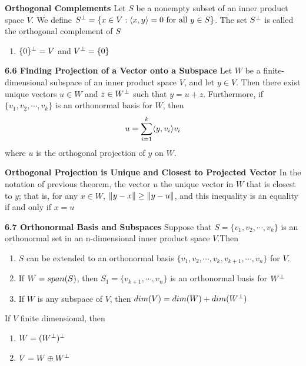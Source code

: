 \documentclass[11pt]{article}
\begin{document}

\begin{defn*}
    \textbf{Orthogonal Complements} Let $S$  be a nonempty subset of an inner product space $V$. We define $S^{\perp} = \{x\in V: \langle x,y\rangle = 0 \text{ for all } y\in S \}$. The set $S^{\perp}$ is called the orthogonal complement of $S$
    \begin{enumerate}
        \item $\{0\}^{\perp} = V$ and $V^{\perp} = \{0\}$ 
    \end{enumerate}
\end{defn*}

\begin{theorem*}
    \textbf{6.6 Finding Projection of a Vector onto a Subspace} Let $W$ be a finite-dimensional subspace of an inner product space $V$, and let $y\in V$. Then there exist unique vectors $u\in W$ and $z\in W^{\perp}$ such that $y=u+z$. Furthermore, if $\{v_1,v_2,\cdots,v_k\}$ is an orthonormal basis for $W$, then 
    \[
        u = \sum_{i=1}^k \langle y,v_i\rangle v_i    
    \]
    where $u$ is the orthogonal projection of $y$ on $W$.
\end{theorem*}


\begin{corollary*}
    \textbf{Orthogonal Projection is Unique and Closest to Projected Vector} In the notation of previous theorem, the vector $u$ the unique vector in $W$ that is closest to $y$; that is, for any $x\in W$, $\left\lVert y-x\right\rVert \geq \left\lVert y-u\right\rVert$, and this inequality is an equality if and only if $x=u$
\end{corollary*}


\begin{theorem*}
    \textbf{6.7 Orthonormal Basis and Subspaces} Suppose that $S = \{v_1,v_2,\cdots, v_k\}$ is an orthonormal set in an n-dimensional inner product space $V$.Then 
    \begin{enumerate}
        \item $S$ can be extended to an orthonormal basis $\{v_1,v_2,\cdots, v_k, v_{k+1}, \cdots, v_n\}$ for $V$. 
        \item If $W = span(S)$, then $S_1 = \{v_{k+1}, \cdots, v_n\}$ is an orthonormal basis for $W^{\perp}$ 
        \item If $W$ is any subspace of $V$, then $dim(V) = dim(W) + dim(W^{\perp})$
    \end{enumerate}
    If $V$ finite dimensional, then 
    \begin{enumerate}
        \item $W = (W^{\perp})^{\perp}$
        \item $V = W \oplus W^{\perp}$
    \end{enumerate}
\end{theorem*}
\end{document}
